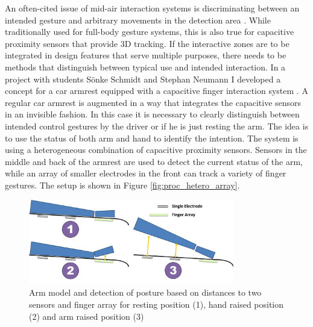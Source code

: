 An often-cited issue of mid-air interaction systems is discriminating between an intended gesture and arbitrary movements in the detection area \cite{hinckley1994survey}. While traditionally used for full-body gesture systems, this is also true for capacitive proximity sensors that provide 3D tracking. If the interactive zones are to be integrated in design features that serve multiple purposes, there needs to be methods that distinguish between typical use and intended interaction. In a project with students Sönke Schmidt and Stephan Neumann I developed a concept for a car armrest equipped with a capacitive finger interaction system \cite{braun2013ActiveArmrest}. A regular car armrest is augmented in a way that integrates the capacitive sensors in an invisible fashion. In this case it is necessary to clearly distinguish between intended control gestures by the driver or if he is just resting the arm. The idea is to use the status of both arm and hand to identify the intention. The system is using a heterogeneous combination of capacitive proximity sensors. Sensors in the middle and back of the armrest are used to detect the current status of the arm, while an array of smaller electrodes in the front can track a variety of finger gestures. The setup is shown in Figure \ref{fig:proc_hetero_array}. 

\begin{figure}[ht]
\centering
\includegraphics[width=0.8\textwidth]{images/proc_hetero_postures}
\caption{Arm model and detection of posture based on distances to two sensors and finger array for resting position (1), hand raised position (2) and arm raised position (3)}
\label{fig:proc_hetero_postures}
\end{figure}

